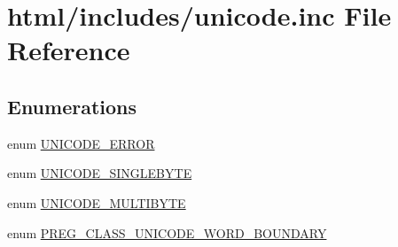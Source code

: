 \hypertarget{unicode_8inc}{
\section{html/includes/unicode.inc File Reference}
\label{unicode_8inc}
}
\subsection*{Enumerations}
\begin{DoxyCompactItemize}
\item 
enum \hyperlink{unicode_8inc_a990de8cbc02e69c8cfe1ac1ec91a8fdc}{UNICODE\_\-ERROR} 
\item 
enum \hyperlink{unicode_8inc_a334f042af88c14fbc70643acda9c77f3}{UNICODE\_\-SINGLEBYTE} 
\item 
enum \hyperlink{unicode_8inc_aad231dfcc1dabe13a4d256cf799949e8}{UNICODE\_\-MULTIBYTE} 
\item 
enum \hyperlink{unicode_8inc_ab7e2c4336deae5e6d3798a4f96c38395}{PREG\_\-CLASS\_\-UNICODE\_\-WORD\_\-BOUNDARY} 
\end{DoxyCompactItemize}
